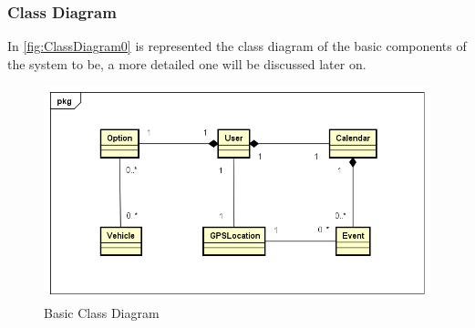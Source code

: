 \subsubsection*{Class Diagram}
In \autoref{fig:ClassDiagram0} is represented the class diagram of the basic components of the system to be, a more detailed one will be discussed later on.
\begin{figure}[h]
\centering
	\includegraphics[width=\textwidth, keepaspectratio=true]{Img/ClassDiagram0}
	\caption{Basic Class Diagram}
	\label{fig:ClassDiagram0}
\end{figure}
\newpage
